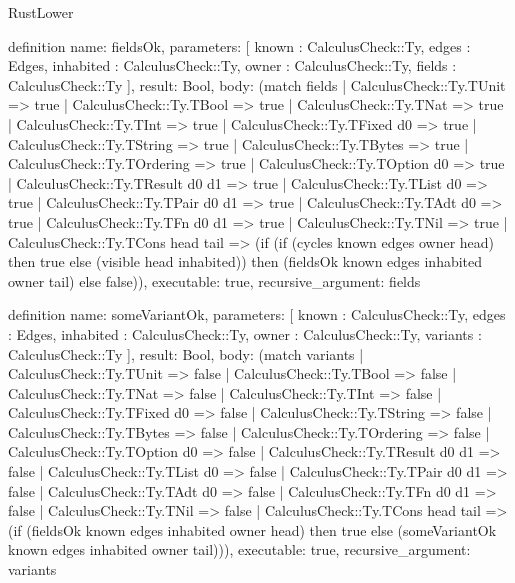 \begin{lexlean}{RustLower}
\begin{semanticmodule}
definition{
  name: fieldsOk,
  parameters: [
    known : CalculusCheck::Ty,
    edges : Edges,
    inhabited : CalculusCheck::Ty,
    owner : CalculusCheck::Ty,
    fields : CalculusCheck::Ty
  ],
  result: Bool,
  body: (match fields
    | CalculusCheck::Ty.TUnit => true
    | CalculusCheck::Ty.TBool => true
    | CalculusCheck::Ty.TNat => true
    | CalculusCheck::Ty.TInt => true
    | CalculusCheck::Ty.TFixed d0 => true
    | CalculusCheck::Ty.TString => true
    | CalculusCheck::Ty.TBytes => true
    | CalculusCheck::Ty.TOrdering => true
    | CalculusCheck::Ty.TOption d0 => true
    | CalculusCheck::Ty.TResult d0 d1 => true
    | CalculusCheck::Ty.TList d0 => true
    | CalculusCheck::Ty.TPair d0 d1 => true
    | CalculusCheck::Ty.TAdt d0 => true
    | CalculusCheck::Ty.TFn d0 d1 => true
    | CalculusCheck::Ty.TNil => true
    | CalculusCheck::Ty.TCons head tail => (if (if (cycles known edges owner head) then true else (visible head inhabited)) then (fieldsOk known edges inhabited owner tail) else false)),
  executable: true,
  recursive_argument: fields
}

definition{
  name: someVariantOk,
  parameters: [
    known : CalculusCheck::Ty,
    edges : Edges,
    inhabited : CalculusCheck::Ty,
    owner : CalculusCheck::Ty,
    variants : CalculusCheck::Ty
  ],
  result: Bool,
  body: (match variants
    | CalculusCheck::Ty.TUnit => false
    | CalculusCheck::Ty.TBool => false
    | CalculusCheck::Ty.TNat => false
    | CalculusCheck::Ty.TInt => false
    | CalculusCheck::Ty.TFixed d0 => false
    | CalculusCheck::Ty.TString => false
    | CalculusCheck::Ty.TBytes => false
    | CalculusCheck::Ty.TOrdering => false
    | CalculusCheck::Ty.TOption d0 => false
    | CalculusCheck::Ty.TResult d0 d1 => false
    | CalculusCheck::Ty.TList d0 => false
    | CalculusCheck::Ty.TPair d0 d1 => false
    | CalculusCheck::Ty.TAdt d0 => false
    | CalculusCheck::Ty.TFn d0 d1 => false
    | CalculusCheck::Ty.TNil => false
    | CalculusCheck::Ty.TCons head tail => (if (fieldsOk known edges inhabited owner head) then true else (someVariantOk known edges inhabited owner tail))),
  executable: true,
  recursive_argument: variants
}


\end{semanticmodule}
\end{lexlean}
